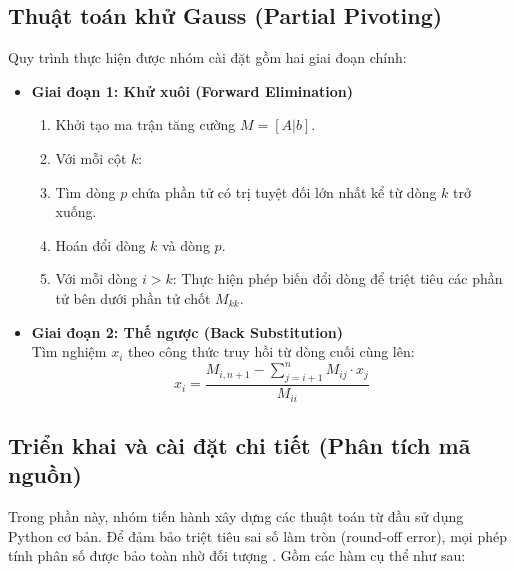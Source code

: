 \documentclass[a4paper]{article}
\begin{document}
\subsection{Thuật toán khử Gauss (Partial Pivoting)}
Quy trình thực hiện được nhóm cài đặt gồm hai giai đoạn chính:
\begin{itemize}
    \item \textbf{Giai đoạn 1: Khử xuôi (Forward Elimination)}
    \begin{enumerate}
        \item Khởi tạo ma trận tăng cường $M = [A|b]$.
        \item Với mỗi cột $k$: 
        \item Tìm dòng $p$ chứa phần tử có trị tuyệt đối lớn nhất kể từ dòng $k$ trở xuống.
        \item Hoán đổi dòng $k$ và dòng $p$.
        \item Với mỗi dòng $i > k$: Thực hiện phép biến đổi dòng để triệt tiêu các phần tử bên dưới phần tử chốt $M_{kk}$.
    \end{enumerate}
    
    \item \textbf{Giai đoạn 2: Thế ngược (Back Substitution)}\\
    Tìm nghiệm $x_i$ theo công thức truy hồi từ dòng cuối cùng lên:
    \begin{equation}
        x_i = \frac{M_{i, n+1} - \sum_{j=i+1}^{n} M_{ij} \cdot x_j}{M_{ii}}
    \end{equation}
\end{itemize}

\subsection{Triển khai và cài đặt chi tiết (Phân tích mã nguồn)}
Trong phần này, nhóm tiến hành xây dựng các thuật toán từ đầu sử dụng Python cơ bản. Để đảm bảo triệt tiêu sai số làm tròn (round-off error), mọi phép tính phân số được bảo toàn nhờ đối tượng . Gồm các hàm cụ thể như sau:
\end{document}
